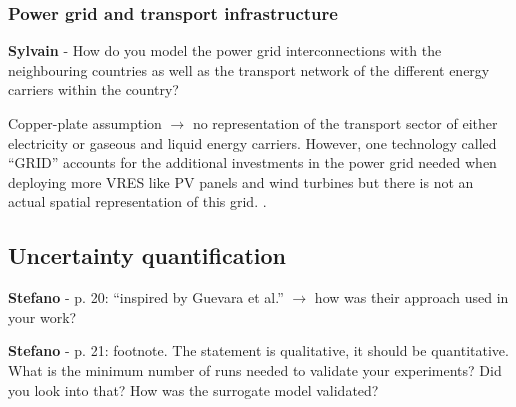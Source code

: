 \documentclass[12pt,a4paper]{article}
\begin{document}
\subsubsection{Power grid and transport infrastructure}

\begin{mdframed}[style=comment] %
{\color{purple} \textbf{Sylvain}} - How do you model the power grid interconnections with the neighbouring countries as well as the transport network of the different energy carriers within the country?
\end{mdframed}

\noindent Copper-plate assumption $\rightarrow$ no representation of the transport sector of either electricity or gaseous and liquid energy carriers. However, one technology called ``GRID'' accounts for the additional investments in the power grid needed when deploying more VRES like PV panels and wind turbines but there is not an actual spatial representation of this grid. {\color{blue} }.

\begin{mdframed}[style=manuscript] %

\end{mdframed}

\subsection{Uncertainty quantification}
\label{methodo_UQ}

\begin{mdframed}[style=comment] %
{\color{orange} \textbf{Stefano}} - p. 20: “inspired by Guevara et al.” $\rightarrow$ how was their approach used in your work?
\end{mdframed}

\noindent 

\begin{mdframed}[style=manuscript] %

\end{mdframed}

\begin{mdframed}[style=comment] %
{\color{orange} \textbf{Stefano}} - p. 21: footnote. The statement is qualitative, it should be quantitative. What is the minimum number of runs needed to validate your experiments? Did you look into that? How was the surrogate model validated?
\end{mdframed}
\end{document}
